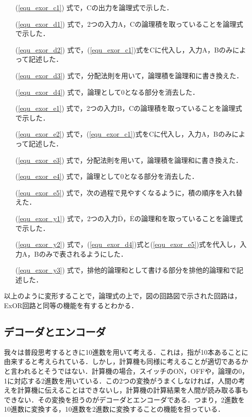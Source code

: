 \begin{itemize}
	\item [(\ref{equ_exor_c1})]式で，Cの出力を論理式で示した．
	\item [(\ref{equ_exor_d1})]式で，2つの入力A，Cの論理積を取っていることを論理式で示した．
	\item [(\ref{equ_exor_d2})]式で，(\ref{equ_exor_c1})式をCに代入し，入力A，Bのみによって記述した．
	\item [(\ref{equ_exor_d3})]式で，分配法則を用いて，論理積を論理和に書き換えた．
	\item [(\ref{equ_exor_d4})]式で，論理として0となる部分を消去した．
	\item [(\ref{equ_exor_e1})]式で，2つの入力B，Cの論理積を取っていることを論理式で示した．
	\item [(\ref{equ_exor_e2})]式で，(\ref{equ_exor_c1})式をCに代入し，入力A，Bのみによって記述した．
	\item [(\ref{equ_exor_e3})]式で，分配法則を用いて，論理積を論理和に書き換えた．
	\item [(\ref{equ_exor_e4})]式で，論理として0となる部分を消去した．
	\item [(\ref{equ_exor_e5})]式で，次の過程で見やすくなるように，積の順序を入れ替えた．
	\item [(\ref{equ_exor_y1})]式で，2つの入力$\overline{\mathrm{D}}$，$\overline{\mathrm{E}}$の論理和を取っていることを論理式で示した．
	\item [(\ref{equ_exor_y2})]式で，(\ref{equ_exor_d4})式と(\ref{equ_exor_e5})式を代入し，入力A，Bのみで表されるようにした．
	\item [(\ref{equ_exor_y3})]式で，排他的論理和として書ける部分を排他的論理和で記述した．
\end{itemize}
以上のように変形することで，論理式の上で，図の回路図で示された回路は，ExOR回路と同等の機能を有するとわかる．


%
%
%
\subsection{デコーダとエンコーダ}
\label{experiment_decoderencoder}
我々は普段思考するときに10進数を用いて考える．これは，指が10本あることに由来すると考えられている．しかし，計算機も同様に考えることが適切であるかと言われるとそうではない．計算機の場合，スイッチのON，OFFや，論理の0，1に対応する2進数を用いている．この2つの変換がうまくしなければ，人間の考えを計算機に伝えることはできないし，計算機の計算結果を人間が読み取る事もできない．その変換を担うのがデコーダとエンコーダである．つまり，2進数を10進数に変換する，10進数を2進数に変換することの機能を担っている．

